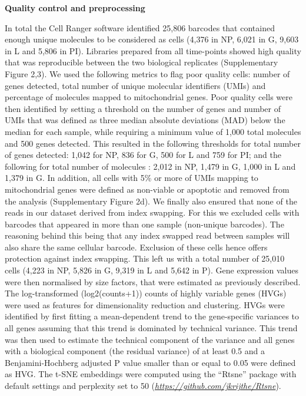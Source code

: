 \documentclass[titlepage, 12pt, oneside]{amsart}
\begin{document}
\textbf{Quality control and preprocessing}

In total the Cell Ranger software identified 25,806 barcodes that contained enough unique molecules to be considered as cells (4,376 in NP, 6,021 in G, 9,603 in L and 5,806 in PI).
Libraries prepared from all time-points showed high quality that was reproducible between the two biological replicates (Supplementary Figure 2,3).
We used the following metrics to flag poor quality cells: number of genes detected, total number of unique molecular identifiers (UMIs) and percentage of molecules mapped to mitochondrial genes.
Poor quality cells were then identified by setting a threshold on the number of genes and number of UMIs that was defined as three median absolute deviations (MAD) below the median for each sample, while requiring a minimum value of 1,000 total molecules and 500 genes detected.  
This resulted in the following thresholds for total number of genes detected: 1,042 for NP, 836 for G, 500 for L and 759 for PI; and the following for total number of molecules : 2,012 in NP, 1,479 in G, 1,000 in L and 1,379 in G.
In addition, all cells with 5\% or more of UMIs mapping to mitochondrial genes were defined as non-viable or apoptotic and removed from the analysis (Supplementary Figure 2d).
We finally also ensured that none of the reads in our dataset derived from index swapping\autocite{Sinha2017, Griffiths2017}.
For this we excluded cells with barcodes that appeared in more than one sample (non-unique barcodes).
The reasoning behind this being that any index swapped read between samples will also share the same cellular barcode.
Exclusion of these cells hence offers protection against index swapping.
This left us with a total number of 25,010 cells (4,223 in NP, 5,826 in G, 9,319 in L and 5,642 in P).
Gene expression values were then normalised by size factors, that were estimated as previously described\autocite{Lun2016}.
The log-transformed (log2(counts+1)) counts of highly variable genes (HVGs) were used as features for dimensionality reduction and clustering.
HVGs were identified by first fitting a mean-dependent trend to the gene-specific variances to all genes assuming that this trend is dominated by technical variance.
This trend was then used to estimate the technical component of the variance and all genes with a biological component (the residual variance) of at least 0.5 and a Benjamini-Hochberg adjusted P value smaller than or equal to 0.05 were defined as HVG.
The t-SNE embeddings were computed using the ``Rtsne'' package with default settings and perplexity set to 50 (\href{https://github.com/jkrijthe/Rtsne}{\textit{https://github.com/jkrijthe/Rtsne}}).
\end{document}
